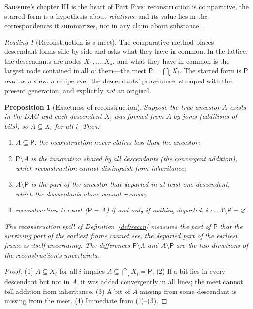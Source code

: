 \documentclass[11pt,a4paper]{article}
\newtheorem{proposition}[principle]{Proposition}
\theoremstyle{remark}
\newtheorem{reading}[principle]{Reading}
\newcommand{\Proto}{\ensuremath{\mathsf{P}}}             %
\begin{document}
Saussure's chapter III is the heart of Part Five: reconstruction is
comparative, the starred form is a hypothesis about \emph{relations}, and its
value lies in the correspondences it summarizes, not in any claim about
substance \cite[Part V, ch.~III]{harris1983}.

\begin{reading}[Reconstruction is a meet]
\label{read:recon}
The comparative method places descendant forms side by side and asks what
they have in common. In the lattice, the descendants are nodes
$X_1,\dots,X_n$, and what they have in common is the largest node contained
in all of them---the meet $\Proto = \bigcap_i X_i$. The starred form is
$\Proto$ read as a view: a recipe over the descendants' provenance, stamped
with the present generation, and explicitly \emph{not} an original.
\end{reading}

\begin{proposition}[Exactness of reconstruction]
\label{prop:recon}
Suppose the true ancestor $A$ exists in the DAG and each descendant
$X_i$ was formed from $A$ by joins (additions of bits), so $A \subseteq X_i$
for all $i$. Then:
\begin{enumerate}[leftmargin=*,nosep]
  \item $A \subseteq \Proto$: the reconstruction never claims less than the
    ancestor;
  \item $\Proto \setminus A$ is the innovation shared by \emph{all}
    descendants (the convergent addition), which reconstruction cannot
    distinguish from inheritance;
  \item $A \setminus \Proto$ is the part of the ancestor that departed in at
    least one descendant, which the descendants alone cannot recover;
  \item reconstruction is exact ($\Proto = A$) if and only if nothing
    departed, i.e.\ $A \setminus \Proto = \varnothing$.
\end{enumerate}
The reconstruction spill of Definition~\ref{def:recon} measures the part of
$\Proto$ that the \emph{surviving} part of the earliest frame cannot see;
the departed part of the earliest frame is itself uncertainty. The
differences $\Proto \setminus A$ and $A \setminus \Proto$ are the two
directions of the reconstruction's uncertainty.
\end{proposition}

\begin{proof}
(1) $A \subseteq X_i$ for all $i$ implies $A \subseteq \bigcap_i X_i =
\Proto$. (2) If a bit lies in every descendant but not in $A$, it was added
convergently in all lines; the meet cannot tell addition from inheritance.
(3) A bit of $A$ missing from some descendant is missing from the meet. (4)
Immediate from (1)--(3).
\end{proof}
\end{document}
